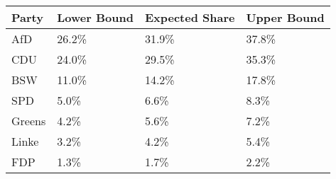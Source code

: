 \begin{tabular}{llll}
  \hline
Party & Lower Bound & Expected Share & Upper Bound \\ 
  \hline
AfD & 26.2\% & 31.9\% & 37.8\% \\ 
  CDU & 24.0\% & 29.5\% & 35.3\% \\ 
  BSW & 11.0\% & 14.2\% & 17.8\% \\ 
  SPD & 5.0\% & 6.6\% & 8.3\% \\ 
  Greens & 4.2\% & 5.6\% & 7.2\% \\ 
  Linke & 3.2\% & 4.2\% & 5.4\% \\ 
  FDP & 1.3\% & 1.7\% & 2.2\% \\ 
   \hline
\end{tabular}
